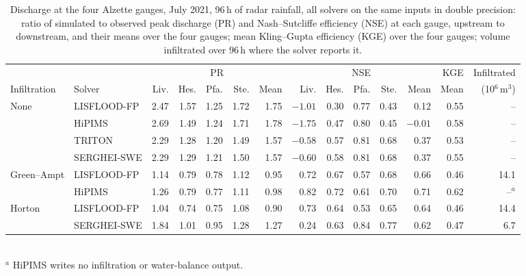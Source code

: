 \documentclass[gmd, manuscript]{copernicus}
\begin{document}
\begin{table}[t]
\caption{Discharge at the four Alzette gauges, July 2021, 96\,h of radar
rainfall, all solvers on the same inputs in double precision: ratio of
simulated to observed peak discharge (PR) and Nash--Sutcliffe efficiency
(NSE) at each gauge, upstream to downstream, and their means over the four
gauges; mean Kling--Gupta efficiency (KGE) over the four gauges; volume
infiltrated over 96\,h where the solver reports it.}
\label{tab:alzette}
\centering\small
\setlength{\tabcolsep}{3.2pt}
\begin{tabular}{@{}ll rrrrr rrrrr r r@{}}
\toprule
& & \multicolumn{5}{c}{PR} & \multicolumn{5}{c}{NSE} & KGE & Infiltrated \\
\cmidrule(lr){3-7}\cmidrule(lr){8-12}
Infiltration & Solver & Liv. & Hes. & Pfa. & Ste. & Mean & Liv. & Hes. & Pfa. & Ste. & Mean & Mean & (10$^6$\,m$^3$) \\
\midrule
\multirow{4}{*}{None} & LISFLOOD-FP & 2.47 & 1.57 & 1.25 & 1.72 & 1.75 & $-1.01$ & 0.30 & 0.77 & 0.43 & 0.12 & 0.55 & -- \\
 & HiPIMS & 2.69 & 1.49 & 1.24 & 1.71 & 1.78 & $-1.75$ & 0.47 & 0.80 & 0.45 & $-0.01$ & 0.58 & -- \\
 & TRITON & 2.29 & 1.28 & 1.20 & 1.49 & 1.57 & $-0.58$ & 0.57 & 0.81 & 0.68 & 0.37 & 0.53 & -- \\
 & SERGHEI-SWE & 2.29 & 1.29 & 1.21 & 1.50 & 1.57 & $-0.60$ & 0.58 & 0.81 & 0.68 & 0.37 & 0.55 & -- \\
\midrule
\multirow{2}{*}{Green--Ampt} & LISFLOOD-FP & 1.14 & 0.79 & 0.78 & 1.12 & 0.95 & 0.72 & 0.67 & 0.57 & 0.68 & 0.66 & 0.46 & 14.1 \\
 & HiPIMS & 1.26 & 0.79 & 0.77 & 1.11 & 0.98 & 0.82 & 0.72 & 0.61 & 0.70 & 0.71 & 0.62 & --$^{a}$ \\
\midrule
\multirow{2}{*}{Horton} & LISFLOOD-FP & 1.04 & 0.74 & 0.75 & 1.08 & 0.90 & 0.73 & 0.64 & 0.53 & 0.65 & 0.64 & 0.46 & 14.4 \\
 & SERGHEI-SWE & 1.84 & 1.01 & 0.95 & 1.28 & 1.27 & 0.24 & 0.63 & 0.84 & 0.77 & 0.62 & 0.47 & 6.7 \\
\bottomrule
\end{tabular}
\\[2pt]{\footnotesize $^{a}$ HiPIMS writes no infiltration or water-balance output.}
\end{table}
\end{document}
